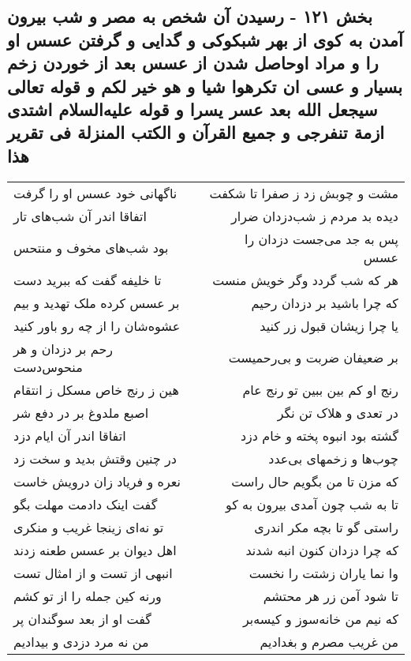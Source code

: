 \begin{center}
\section*{بخش ۱۲۱ - رسیدن آن شخص به مصر و شب بیرون آمدن به کوی از بهر شبکوکی و گدایی و گرفتن عسس او را و مراد اوحاصل شدن از عسس بعد از خوردن زخم بسیار و عسی ان تکرهوا شیا و هو خیر لکم و قوله  تعالی سیجعل الله بعد عسر یسرا و قوله علیه‌السلام اشتدی ازمة  تنفرجی و جمیع القرآن و الکتب المنزلة فی تقریر هذا}
\label{sec:sh121}
\begin{longtable}{l p{0.5cm} r}
ناگهانی خود عسس او را گرفت
&&
مشت و چوبش زد ز صفرا تا شکفت
\\
اتفاقا اندر آن شب‌های تار
&&
دیده بد مردم ز شب‌دزدان ضرار
\\
بود شب‌های مخوف و منتحس
&&
پس به جد می‌جست دزدان را عسس
\\
تا خلیفه گفت که ببرید دست
&&
هر که شب گردد وگر خویش منست
\\
بر عسس کرده ملک تهدید و بیم
&&
که چرا باشید بر دزدان رحیم
\\
عشوه‌شان را از چه رو باور کنید
&&
یا چرا زیشان قبول زر کنید
\\
رحم بر دزدان و هر منحوس‌دست
&&
بر ضعیفان ضربت و بی‌رحمیست
\\
هین ز رنج خاص مسکل ز انتقام
&&
رنج او کم بین ببین تو رنج عام
\\
اصبع ملدوغ بر در دفع شر
&&
در تعدی و هلاک تن نگر
\\
اتفاقا اندر آن ایام دزد
&&
گشته بود انبوه پخته و خام دزد
\\
در چنین وقتش بدید و سخت زد
&&
چوب‌ها و زخمهای بی‌عدد
\\
نعره و فریاد زان درویش خاست
&&
که مزن تا من بگویم حال راست
\\
گفت اینک دادمت مهلت بگو
&&
تا به شب چون آمدی بیرون به کو
\\
تو نه‌ای زینجا غریب و منکری
&&
راستی گو تا بچه مکر اندری
\\
اهل دیوان بر عسس طعنه زدند
&&
که چرا دزدان کنون انبه شدند
\\
انبهی از تست و از امثال تست
&&
وا نما یاران زشتت را نخست
\\
ورنه کین جمله را از تو کشم
&&
تا شود آمن زر هر محتشم
\\
گفت او از بعد سوگندان پر
&&
که نیم من خانه‌سوز و کیسه‌بر
\\
من نه مرد دزدی و بیدادیم
&&
من غریب مصرم و بغدادیم
\\
\end{longtable}
\end{center}
